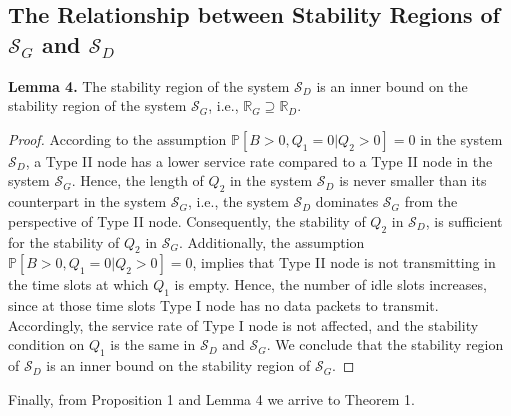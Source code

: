 \documentclass[draftcls,12pt,onecolumn]{IEEEtran}
\begin{document}
\subsection{The Relationship between Stability Regions of $\mathcal{S}_G$ and $\mathcal{S}_D$}\label{subsec: rel}
\indent \textbf{Lemma 4.} The stability region of the system $\mathcal{S}_D$ is an inner bound on the stability region of the system $\mathcal{S}_G$, i.e., $\mathbb{R}_G \supseteq \mathbb{R}_D$.  
\begin{proof}
According to the assumption $\mathbb{P}[B\!>\!0, Q_1\!=\! 0| Q_2\!>\!0]\!=\!0$ in the system $\mathcal{S}_D $, a Type II node has a lower service rate compared to a Type II node in the system $\mathcal{S}_G $. Hence, the length of $Q_2$ in the system $\mathcal{S}_D$ is never smaller than its counterpart in the system $\mathcal{S}_G$, i.e., the system $\mathcal{S}_D$ dominates $\mathcal{S}_G$ from the perspective of Type II node. Consequently, the stability of $Q_2$ in $\mathcal{S}_D $, is sufficient for the stability of $Q_2$ in $\mathcal{S}_G$. Additionally, the assumption $\mathbb{P}[B\!>\!0, Q_1\!=\! 0| Q_2\!>\!0]\!=\!0$, implies that Type II node is not transmitting in the time slots at which $ Q_1$ is empty. Hence, the number of idle slots increases, since at those time slots Type I node has no data packets to transmit. Accordingly, the service rate of Type I node is not affected, and the stability condition on $Q_1$ is the same in $\mathcal{S}_D$ and $\mathcal{S}_G$. We conclude that the stability region of $\mathcal{S}_D$ is an inner bound on the stability region of $\mathcal{S}_G$.
\end{proof}
Finally, from Proposition 1 and Lemma 4 we arrive to Theorem 1. 
\end{document}
